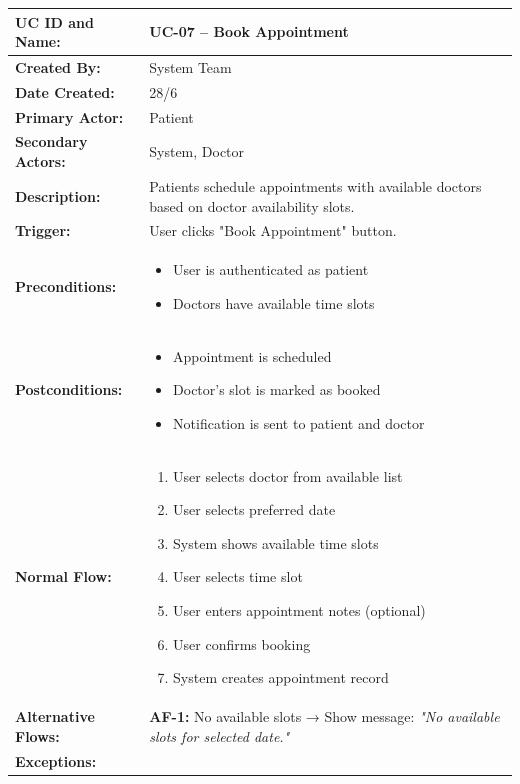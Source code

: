 \documentclass[12pt,a4paper]{article}
\begin{document}
\renewcommand{\arraystretch}{1.5}
\begin{longtable}{|p{4.5cm}|p{10.5cm}|}
\hline
\textbf{UC ID and Name:} & UC-07 – Book Appointment \\
\hline
\textbf{Created By:} & System Team \\
\hline
\textbf{Date Created:} & 28/6 \\
\hline
\textbf{Primary Actor:} & Patient \\
\hline
\textbf{Secondary Actors:} & System, Doctor \\
\hline
\textbf{Description:} & Patients schedule appointments with available doctors based on doctor availability slots. \\
\hline
\textbf{Trigger:} & User clicks "Book Appointment" button. \\
\hline
\textbf{Preconditions:} &
\begin{itemize}
  \item User is authenticated as patient
  \item Doctors have available time slots
\end{itemize} \\
\hline
\textbf{Postconditions:} &
\begin{itemize}
  \item Appointment is scheduled
  \item Doctor's slot is marked as booked
  \item Notification is sent to patient and doctor
\end{itemize} \\
\hline
\textbf{Normal Flow:} &
\begin{enumerate}
  \item User selects doctor from available list
  \item User selects preferred date
  \item System shows available time slots
  \item User selects time slot
  \item User enters appointment notes (optional)
  \item User confirms booking
  \item System creates appointment record
\end{enumerate} \\
\hline
\textbf{Alternative Flows:} &
\textbf{AF-1:} No available slots → Show message: \textit{"No available slots for selected date."} \\
\hline
\textbf{Exceptions:} &
\begin{itemize}

\end{itemize}
\end{longtable}
\end{document}

